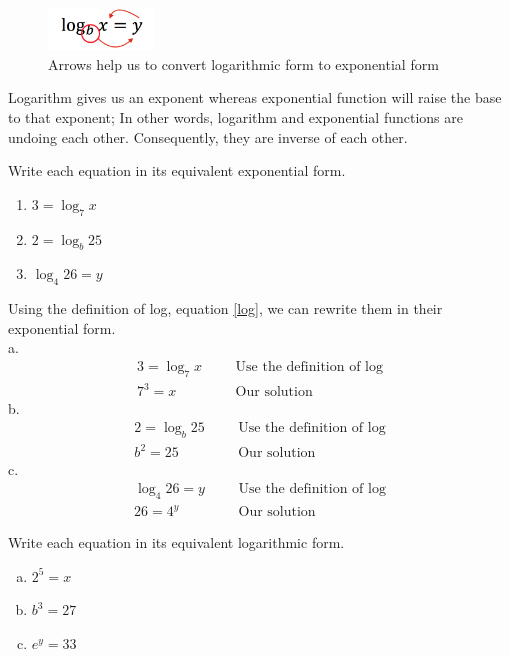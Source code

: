 		\begin{figure}[H]
		 \centering
		 \includegraphics[width=0.25\textwidth]{pics/log_arrow.png}
		 \caption{Arrows help us to convert logarithmic form to exponential form}
		 \label{fig:log_arrows}
		\end{figure}
\begin{fact}
Logarithm gives us an exponent whereas exponential function will raise the base to 
that exponent; In other words, logarithm and exponential functions are undoing each 
other. Consequently, they are inverse of each other.
\end{fact}
\begin{exa}
	Write each equation in its equivalent exponential form.
	\begin{multicols}{3}
	\begin{enumerate}[\bfseries a.]
		\centering
		\item $3= \log_{7}x$	
		\item $2= \log_{b}25$
		\item $\log_{4}26=y$
	\end{enumerate}
	\end{multicols}
\end{exa}
Using the definition of log, equation \eqref{log}, we can rewrite them in their 
exponential form.\\[1cm]
a.
\begin{align*}
	  3 =\log_{7}x&  &&\text{Use the definition of log}\\
	7^3 =x&	&&\text{Our solution}
\end{align*}
b.
\begin{align*}
	  2 =\log_{b}25&  &&\text{Use the definition of log}\\
	b^2 =25&	&&\text{Our solution}
\end{align*}
c.
\begin{align*}
	\log_{4}26 =y&  &&\text{Use the definition of log}\\
	26 =4^y&	&&\text{Our solution}
\end{align*}
\begin{exa}
	Write each equation in its equivalent logarithmic form.
	\begin{multicols}{3}
	\begin{enumerate}[a.]
		\centering
		\item $2^5=x$	
		\item $b^3=27$
		\item $e^y=33$
	\end{enumerate}
	\end{multicols}
\end{exa}
